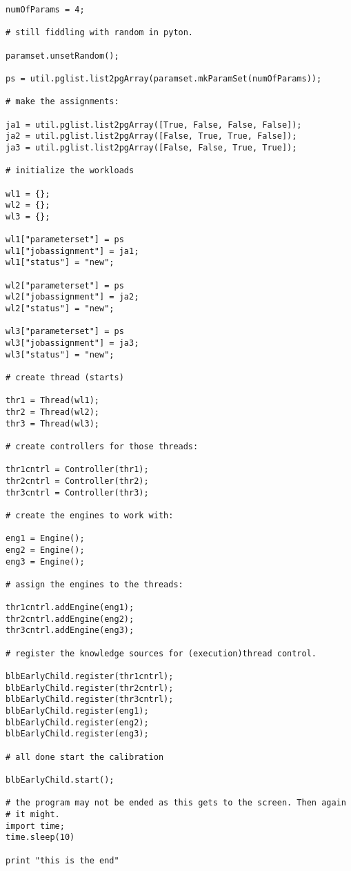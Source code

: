 \documentclass[]{lofar}
\begin{document}
\begin{Verbatim}[]
numOfParams = 4;

# still fiddling with random in pyton.

paramset.unsetRandom();

ps = util.pglist.list2pgArray(paramset.mkParamSet(numOfParams));

# make the assignments:

ja1 = util.pglist.list2pgArray([True, False, False, False]);
ja2 = util.pglist.list2pgArray([False, True, True, False]);
ja3 = util.pglist.list2pgArray([False, False, True, True]);

# initialize the workloads

wl1 = {};
wl2 = {};
wl3 = {};

wl1["parameterset"] = ps
wl1["jobassignment"] = ja1;
wl1["status"] = "new";

wl2["parameterset"] = ps 
wl2["jobassignment"] = ja2;
wl2["status"] = "new";

wl3["parameterset"] = ps 
wl3["jobassignment"] = ja3;
wl3["status"] = "new";

# create thread (starts)

thr1 = Thread(wl1);
thr2 = Thread(wl2);
thr3 = Thread(wl3);

# create controllers for those threads:

thr1cntrl = Controller(thr1);
thr2cntrl = Controller(thr2);
thr3cntrl = Controller(thr3);

# create the engines to work with:

eng1 = Engine();
eng2 = Engine();
eng3 = Engine();

# assign the engines to the threads:

thr1cntrl.addEngine(eng1);
thr2cntrl.addEngine(eng2);
thr3cntrl.addEngine(eng3);

# register the knowledge sources for (execution)thread control.

blbEarlyChild.register(thr1cntrl);
blbEarlyChild.register(thr2cntrl);
blbEarlyChild.register(thr3cntrl);
blbEarlyChild.register(eng1);
blbEarlyChild.register(eng2);
blbEarlyChild.register(eng3);

# all done start the calibration

blbEarlyChild.start();

# the program may not be ended as this gets to the screen. Then again
# it might.
import time;
time.sleep(10)

print "this is the end"
\end{Verbatim}

  \label{app:stub-code}\hypertarget{app:stub-code}{}
\end{document}
